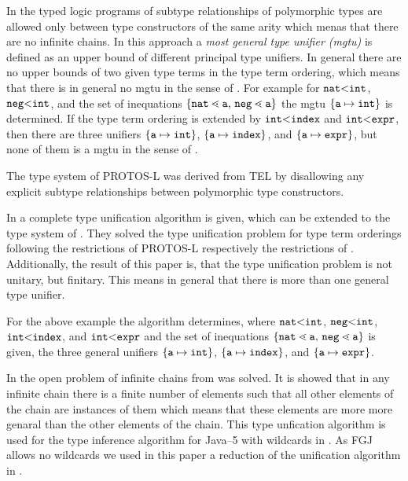 In the typed logic programs of \cite{HiTo92} subtype
relationships of polymorphic types are allowed only between type
constructors of the same arity which menas that there are no infinite chains.
In this approach a \emph{most general type unifier (mgtu)} is
defined as an upper bound of different principal type unifiers. In general
there are no upper bounds of two given type terms in the type term ordering,
which means that there is in general no mgtu in the sense of \cite{HiTo92}.
For example for  $\texttt{nat} \mbox{$<$} \texttt{int}$, $\texttt{neg} 
\mbox{$<$} \texttt{int}$, and the set of inequations $\set{\mathtt{nat} \lessdot
  \mathtt{a}$, $\mathtt{neg} \lessdot \mathtt{a}}$ the mgtu $\{ \mathtt{a} \mapsto \texttt{int} \}$ is
determined. If the type term ordering is extended by $\mathtt{int} \mbox{$<$}
\mathtt{index}$ and $\mathtt{int} \mbox{$<$} \mathtt{expr}$, then there are three
unifiers $\{ \mathtt{a} \mapsto \texttt{int} \}$, $\{ \mathtt{a} \mapsto
  \mathtt{index} \}$, and $\{ \mathtt{a} \mapsto 
\mathtt{expr} \}$, but none of them is a mgtu in the sense of \cite{HiTo92}.

The type system of \textsf{PROTOS-L} \cite{CB95} was
derived from \textsf{TEL} by disallowing any explicit subtype relationships
between polymorphic type constructors. 

In \cite{CB95}
a complete type unification algorithm is given, which can be extended to the
type system of \cite{HiTo92}. They solved the type unification problem for type
term orderings following the restrictions of \textsf{PROTOS-L} respectively the
restrictions of \cite{HiTo92}. Additionally, the result of this paper is, that
the type unification problem is not unitary, but finitary. This means in
general that there is more than one general type unifier. 

For the above example the algorithm determines, where $\texttt{nat} \mbox{$<$}
\texttt{int}$, $\texttt{neg} \mbox{$<$} \texttt{int}$, $\mathtt{int} \mbox{$<$}
\mathtt{index}$, and $\mathtt{int} \mbox{$<$} \mathtt{expr}$ and the set of
inequations $\set{\mathtt{nat} \lessdot
  \mathtt{a}$, $\mathtt{neg} \lessdot \mathtt{a}}$ is given, the three general
unifiers $\{ \mathtt{a} \mapsto \texttt{int} \}$, $\{ \mathtt{a} \mapsto
  \mathtt{index} \}$, and $\{ \mathtt{a} \mapsto \mathtt{expr} \}$. 

In \cite{plue09_1} the open problem of infinite chains from \cite{GS89} was
solved. It is showed that in any infinite chain there is a finite number of elements such that
all other elements of the chain are instances of them which means that these
elements are more more genaral than the other elements of the chain. This type
unfication algorithm is used for the type inference algorithm for Java--5 with
wildcards in \cite{Plue07_3}. As FGJ allows no wildcards we used in this paper
a reduction  of the unification algorithm in \cite{plue09_1}.

